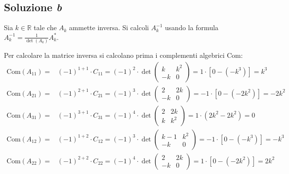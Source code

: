 \documentclass[a4paper]{article}
\begin{document}
	\subsection{Soluzione \emph{b}}
	
	Sia $k \in \mathbb{R}$ tale che $A_{k}$ ammette inversa. Si calcoli $A_{k}^{-1}$ usando la formula $A_{k}^{-1} = \frac{1}{\det\left(A_{k}\right)} A_{k}^{*}$.\newline
	
	\noindent
	Per calcolare la matrice inversa si calcolano prima i complementi algebrici $\mathrm{Com}$:
	\begin{equation*}
		\begin{array}{ll}
			\mathrm{Com}\left(A_{11}\right) = & \left(-1\right)^{1+1} \cdot C_{11} = \left(-1\right)^{2} \cdot \det\begin{pmatrix}
				k & k^{2} \\
				-k & 0
			\end{pmatrix} = 1 \cdot \left[0 - \left(-k^{3}\right)\right] = k^{3} \\ [1.2em]
			
			\mathrm{Com}\left(A_{21}\right) = & \left(-1\right)^{2+1} \cdot C_{21} = \left(-1\right)^{3} \cdot \det\begin{pmatrix}
				2  & 2k \\
				-k & 0
			\end{pmatrix} = -1 \cdot \left[0 - \left(-2k^{2}\right)\right] = -2k^{2} \\ [1.2em]
			
			\mathrm{Com}\left(A_{31}\right) = & \left(-1\right)^{3+1} \cdot C_{31} = \left(-1\right)^{4} \cdot \det\begin{pmatrix}
				2 & 2k \\
				k & k^{2}
			\end{pmatrix} = 1 \cdot \left(2k^{2} - 2k^{2}\right) = 0 \\ [1.2em]
			
			\mathrm{Com}\left(A_{12}\right) = & \left(-1\right)^{1+2} \cdot C_{12} = \left(-1\right)^{3} \cdot \det\begin{pmatrix}
				k-1 & k^{2} \\
				-k  & 0
			\end{pmatrix} = -1 \cdot \left[0 - \left(-k^{3}\right)\right] = -k^{3} \\ [1.2em]
			
			\mathrm{Com}\left(A_{22}\right) = & \left(-1\right)^{2+2} \cdot C_{22} = \left(-1\right)^{4} \cdot \det\begin{pmatrix}
				2  & 2k \\
				-k & 0
			\end{pmatrix} = 1 \cdot \left[0 - \left(-2k^{2}\right)\right] = 2k^{2} \\ [1.2em]
			

\end{array}
\end{equation*}
\end{document}
